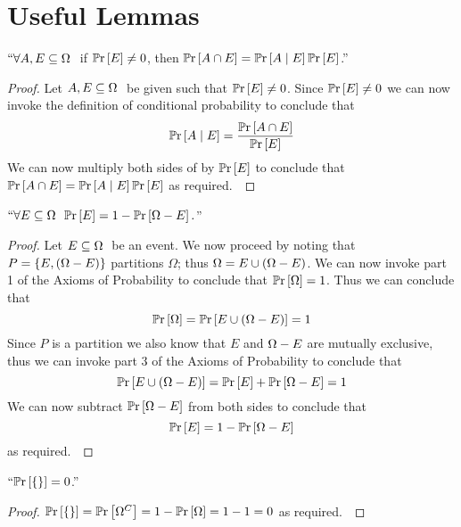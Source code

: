     \section{Useful Lemmas}
        \begin{lemma}
            $``\forall A, E \subseteq \Omega \ $ if $\mathbb{P}\mathrm{r} \left[E\right] \neq 0$, then
            $\mathbb{P}\mathrm{r} \left[A \cap E\right] = \mathbb{P}\mathrm{r}\left[A \mid E\right] \mathbb{P}\mathrm{r} \left[E\right]$.''
            \label{Conditional Probability Lemma}
        \end{lemma}
        \begin{proof}
            Let $A, E \subseteq \Omega \ $ be given such that $\mathbb{P}\mathrm{r} \left[E\right] \neq 0$.
            Since $\mathbb{P}\mathrm{r} \left[E\right] \neq 0$ we can now invoke the definition of conditional probability to
            conclude that
            \begin{equation}
                \mathbb{P}\mathrm{r}\left[A \mid E\right] = \frac{\mathbb{P}\mathrm{r} \left[A \cap E\right]}{\mathbb{P}\mathrm{r} \left[E\right]}
                \label{Conditional Probability Lemma equation 1}
            \end{equation}
            We can now multiply both sides of 
            by $\mathbb{P}\mathrm{r} \left[E\right]$ to conclude that $\mathbb{P}\mathrm{r} \left[A \cap E\right] = \mathbb{P}\mathrm{r}\left[A \mid E\right] \mathbb{P}\mathrm{r} \left[E\right]$ as
            required.~\QED
        \end{proof}
        \begin{lemma}
            $``\forall E \subseteq \Omega \  \ \mathbb{P}\mathrm{r} \left[E\right] = 1 - \mathbb{P}\mathrm{r} \left[\Omega - E\right].$''
            \label{Complement Lemma}
        \end{lemma}
        \begin{proof}
            Let $E \subseteq \Omega \ $ be an event. We now proceed by noting that
            $P = \left\{E, \left(\Omega - E\right)\right\}$ partitions $\Omega$; thus
            $\Omega = E \cup \left(\Omega - E\right)$.
            We can now invoke part 1 of the Axioms of Probability to conclude that
            $\mathbb{P}\mathrm{r} \left[\Omega\right] = 1$. Thus we can conclude that 
            \[
                \mathbb{P}\mathrm{r} \left[\Omega\right] = \mathbb{P}\mathrm{r} \left[E \cup \left(\Omega - E\right)\right] = 1
            \]
            Since $P$ is a partition we also know that $E$ and $\Omega - E$ are
            mutually exclusive, thus we can invoke part 3 of the Axioms of Probability
            to conclude that
            \[
                \mathbb{P}\mathrm{r} \left[E \cup \left(\Omega - E\right)\right] = \mathbb{P}\mathrm{r} \left[E\right] + \mathbb{P}\mathrm{r} \left[\Omega - E\right] = 1
            \]
            We can now subtract $\mathbb{P}\mathrm{r} \left[\Omega - E\right]$ from both sides to conclude that
            \[
                \mathbb{P}\mathrm{r} \left[E\right] = 1 - \mathbb{P}\mathrm{r} \left[\Omega - E\right]
            \]
            as required.~\QED
        \end{proof}
        \begin{corollary}
            $``\mathbb{P}\mathrm{r} \left[\left\{\right\}\right] = 0$.''
        \end{corollary}
        \begin{proof}
            $\mathbb{P}\mathrm{r} \left[\left\{\right\}\right] = \mathbb{P}\mathrm{r} \left[\Omega^{C}\right] = 1 - \mathbb{P}\mathrm{r} \left[\Omega\right] = 1 - 1 = 0$ as required.~\QED
        \end{proof}
